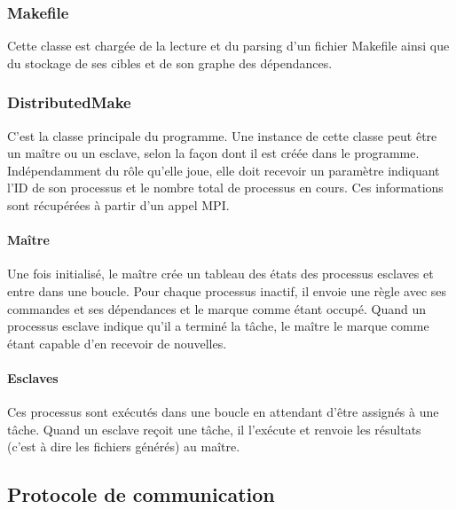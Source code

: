 \documentclass[a4paper,12pt,twoside]{article}
\begin{document}
\subsubsection{Makefile}

Cette classe est chargée de la lecture et du parsing d'un fichier
Makefile ainsi que du stockage de ses cibles et de son graphe des dépendances.

\subsubsection{DistributedMake}

C'est la classe principale du programme. Une instance de cette classe
peut être un maître ou un esclave, selon la façon dont il est créée
dans le programme. Indépendamment du rôle qu'elle joue, elle doit
recevoir un paramètre indiquant l'ID de son processus et le nombre
total de processus en cours. Ces informations sont récupérées à partir
d'un appel MPI. 

\paragraph{Maître}

Une fois initialisé, le maître crée un tableau des états des
processus esclaves et entre dans une boucle. Pour chaque processus
inactif, il envoie une règle avec ses commandes et ses dépendances et
le marque comme étant occupé. Quand un processus esclave indique qu'il a terminé la tâche,
le maître le marque comme étant capable d'en recevoir de nouvelles.

\paragraph{Esclaves}

Ces processus sont exécutés dans une boucle en attendant d'être assignés
à une tâche. Quand un esclave reçoit une tâche, il l'exécute et
renvoie les résultats (c'est à dire les fichiers générés) au maître.

\subsection{Protocole de communication}
\end{document}
